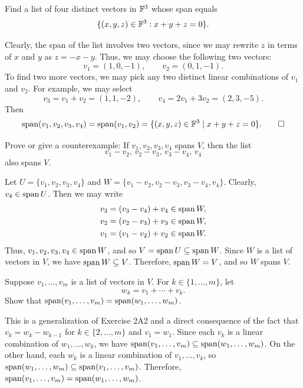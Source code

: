\begin{exc}

\begin{exercise}
Find a list of four distinct vectors in $\mathbb{F}^3$ whose span equals
\[ \{(x,y,z)\in\mathbb{F}^3 : x+y+z=0\}. \]
\end{exercise}
\begin{solution}
Clearly, the span of the list involves two vectors, since we may rewrite $z$ in
terms of $x$ and $y$ as $z=-x-y$. Thus, we may choose the following two
vectors:
\[ v_1=(1,0,-1), \qquad v_2=(0,1,-1). \]
To find two more vectors, we may pick any two distinct linear combinations of
$v_1$ and $v_2$. For example, we may select
\[ v_3=v_1+v_2=(1,1,-2), \qquad v_4=2v_1+3v_2=(2,3,-5). \]
Then
\[ \operatorname{span}(v_1,v_2,v_3,v_4)=\operatorname{span}(v_1,v_2)=\{(x,y,z)\in\mathbb{F}^3 \mid x+y+z=0\}.
   \qedhere \]
\end{solution}

\begin{exercise}
Prove or give a counterexample: If $v_1,v_2,v_3,v_4$ spans $V$, then the list
\[ v_1-v_2,\,v_2-v_3,\,v_3-v_4,\,v_4 \]
also spans $V$.
\end{exercise}
\begin{solution}
Let $U=\{v_1,v_2,v_3,v_4\}$ and $W=\{v_1-v_2,v_2-v_3,v_3-v_4,v_4\}$. Clearly,
$v_4\in\operatorname{span} U$. Then we may write
\begin{align*}
v_3 &= (v_3-v_4)+v_4\in\operatorname{span} W,\\
v_2 &= (v_2-v_3)+v_3\in\operatorname{span} W,\\
v_1 &= (v_1-v_2)+v_2\in\operatorname{span} W.
\end{align*}
Thus, $v_1,v_2,v_3,v_4\in\operatorname{span} W$, and so $V=\operatorname{span} U\subseteq\operatorname{span} W$. Since $W$
is a list of vectors in $V$, we have $\operatorname{span} W\subseteq V$. Therefore,
$\operatorname{span} W=V$, and so $W$ spans $V$.
\end{solution}

\begin{exercise}
Suppose $v_1,\dots,v_m$ is a list of vectors in $V$. For $k\in\{1,\dots,m\}$,
let
\[ w_k = v_1+\cdots+v_k. \]
Show that $\operatorname{span}(v_1,\dots,v_m)=\operatorname{span}(w_1,\dots,w_m)$.
\end{exercise}
\begin{solution}
This is a generalization of Exercise 2A2 and a direct consequence of the fact
that $v_k=w_k-w_{k-1}$ for $k\in\{2,\dots,m\}$ and $v_1=w_1$. Since each $v_k$
is a linear combination of $w_1,\dots,w_k$, we have
$\operatorname{span}(v_1,\dots,v_m)\subseteq\operatorname{span}(w_1,\dots,w_m)$. On the other hand, each
$w_k$ is a linear combination of $v_1,\dots,v_k$, so
$\operatorname{span}(w_1,\dots,w_m)\subseteq\operatorname{span}(v_1,\dots,v_m)$. Therefore,
$\operatorname{span}(v_1,\dots,v_m)=\operatorname{span}(w_1,\dots,w_m)$.
\end{solution}


\end{exc}
